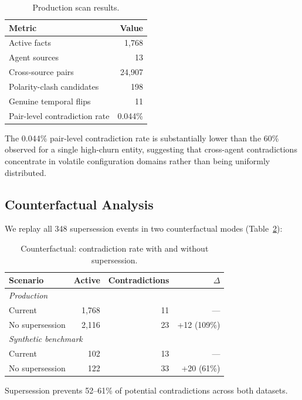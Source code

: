 \documentclass{article}
\begin{document}
\begin{table}[h]
\centering
\caption{Production scan results.}
\begin{tabular}{lr}
\toprule
Metric & Value \\
\midrule
Active facts & 1{,}768 \\
Agent sources & 13 \\
Cross-source pairs & 24{,}907 \\
Polarity-clash candidates & 198 \\
Genuine temporal flips & 11 \\
Pair-level contradiction rate & 0.044\% \\
\bottomrule
\end{tabular}
\label{tab:prod}
\end{table}

The 0.044\% pair-level contradiction rate is substantially lower than the 60\% observed for a single high-churn entity, suggesting that cross-agent contradictions concentrate in volatile configuration domains rather than being uniformly distributed.

\subsection{Counterfactual Analysis}

We replay all 348 supersession events in two counterfactual modes (Table~\ref{tab:counterfactual}):

\begin{table}[h]
\centering
\caption{Counterfactual: contradiction rate with and without supersession.}
\begin{tabular}{lrrr}
\toprule
Scenario & Active & Contradictions & $\Delta$ \\
\midrule
\multicolumn{4}{l}{\emph{Production}} \\
Current & 1{,}768 & 11 & --- \\
No supersession & 2{,}116 & 23 & +12 (109\%) \\
\midrule
\multicolumn{4}{l}{\emph{Synthetic benchmark}} \\
Current & 102 & 13 & --- \\
No supersession & 122 & 33 & +20 (61\%) \\
\bottomrule
\end{tabular}
\label{tab:counterfactual}
\end{table}

Supersession prevents 52--61\% of potential contradictions across both datasets.
\end{document}
